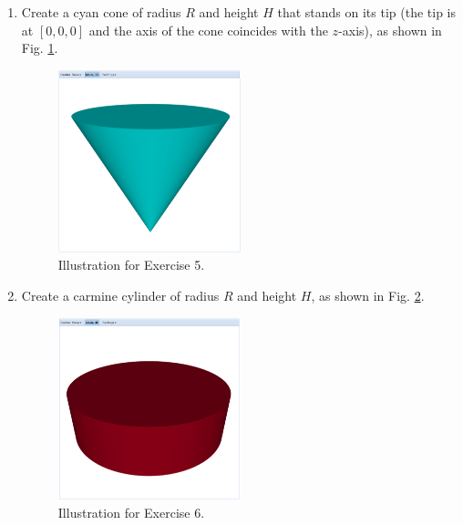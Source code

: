 \documentclass{article}
\begin{document}
\begin{enumerate}
\item Create a cyan cone of radius $R$ and height $H$ that stands on its tip
(the tip is at $[0, 0, 0]$ and the axis of the cone coincides with the 
$z$-axis), as shown in Fig. \ref{fig:a5}.

\begin{figure}[!ht]
\begin{center}
\includegraphics[width=0.5\textwidth]{img/a5-cyan-cone.png}
\end{center}
\vspace{-4mm}
\caption{Illustration for Exercise 5.}
\label{fig:a5}
\end{figure}

\item  Create a carmine cylinder of radius $R$ and height $H$, 
as shown in Fig. \ref{fig:a6}.

\begin{figure}[!ht]
\begin{center}
\includegraphics[width=0.5\textwidth]{img/a6-carmine-cylinder.png}
\end{center}
\vspace{-2mm}
\caption{Illustration for Exercise 6.}
\label{fig:a6}
\end{figure}
\newpage


\end{enumerate}
\end{document}
